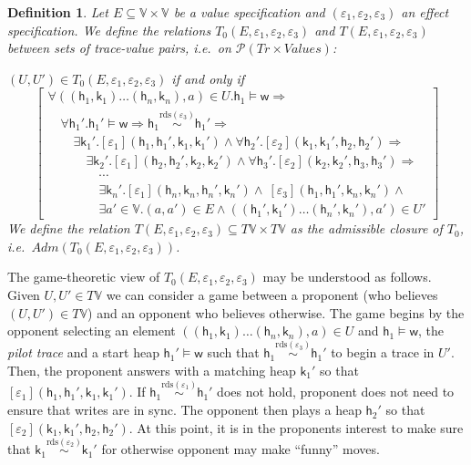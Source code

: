 \documentclass[nocopyrightspace,preprint]{sigplanconf}
\newcommand{\rdsin}[1]{\mathrm{rds}({#1})}
\newcommand{\eff}{\varepsilon}
\newcommand{\reads}{\mathrm{rds}}
\newcommand{\rds}{\reads}
\newtheorem{definition}[theorem]{Definition}
\newcommand\w{\ensuremath{\mathsf{w}}\xspace}
\newcommand\heap{\ensuremath{\mathsf{h}}\xspace}
\newcommand\h{\heap}
\renewcommand\k{\ensuremath{\mathsf{k}}\xspace}
\newcommand{\Values}{\mathbb{V}}
\newcommand\rloc[3]{\ensuremath{#1 \stackrel{#3}{\sim} #2}}
\newcommand{\tup}[1]{(#1)}
\begin{document}
\begin{definition}
\label{defn:crucial}
Let $E\subseteq \Values\times\Values$ be a value specification 
and $(\eff_1, \eff_2, \eff_3)$ an effect specification. We
define the relations $T_0(E,\eff_1,\eff_2,\eff_3)$ and 
$T(E,\eff_1,\eff_2,\eff_3)$ between sets of trace-value pairs, i.e.\ on $\mathcal{P}(\mathit{Tr}\times\textit{Values})$: 

$(U,U')\in T_0(E,\eff_1,\eff_2,\eff_3)$ if and only if 
\[
\left[\begin{array}{l}
\forall \tup{(\h_1,\k_1) \ldots (\h_n,\k_n),a}\in U.\h_1\models\w\Rightarrow\\
\quad \forall \h_1'. \h_1'\models\w\Rightarrow
\rloc{\h_1}{\h_1'}{\rds(\eff_3)}\Rightarrow\\
\qquad \exists \k_1'. [\eff_1](\h_1,\h_1',\k_1,\k_1') \land
\forall \h_2'. [\eff_2](\k_1,\k_1',\h_2,\h_2') \Rightarrow \\
\quad \qquad \exists \k_2'. [\eff_1](\h_2,\h_2',\k_2,\k_2') \land
\forall \h_3'. [\eff_2](\k_2,\k_2',\h_3,\h_3') \Rightarrow \\
\qquad \qquad \cdots\\
\qquad \qquad\exists \k_n'. [\eff_1](\h_n,\k_n,\h_n',\k_n') \land~
[\eff_3](\h_1,\h_1',\k_n,\k_n') \land\\ 
\qquad \qquad \exists a' \in\Values. 
(a,a')\in E \land  
\tup{(\h_1',\k_1')\ldots (\h_n',\k_n'),a'}\in U'
 \end{array}\right] 
 \]
We define the relation $T(E,\eff_1,\eff_2,\eff_3)\subseteq T\Values\times T\Values$ as the admissible closure of $T_0$, i.e.\ $\textit{Adm}(T_0(E,\eff_1,\eff_2,\eff_3))$. 
\end{definition}
The game-theoretic view of $T_0(E,\eff_1,\eff_2,\eff_3)$ may be
understood as follows. Given $U,U'\in T\Values$ we can consider a
game between a proponent (who believes $(U,U')\in T\Values$)
and an opponent who believes otherwise. The game begins by the
opponent selecting an element $\tup{(\h_1,\k_1) \ldots
  (\h_n,\k_n),a}\in U$ and $\h_1\models\w$, the \emph{pilot trace} and a 
start heap $\h_1'\models\w$ such that $\rloc{\h_1}{\h_1'}{\rdsin{\eff_3}}$
 to begin a trace in $U'$. Then, the proponent answers with a matching heap $\k_1'$ so that $[\eff_1](\h_1,\h_1',\k_1,\k_1')$. If $\rloc{\h_1}{\h_1'}{\rdsin{\eff_1}}$ does not hold, proponent does not need to ensure that writes are in sync. 
The opponent
then plays a heap $\h_2'$ so that
$[\eff_2](\k_1,\k_1',\h_2,\h_2')$. At this point, it is in the proponents interest to make sure that $\rloc{\k_1}{\k_1'}{\rdsin{\eff_2}}$ for otherwise opponent may make ``funny'' moves.
\end{document}
